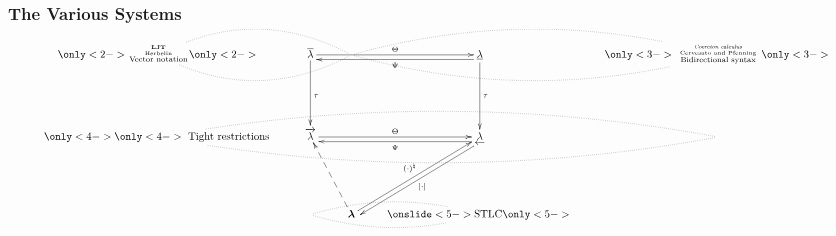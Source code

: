 \begin{frame}
  \frametitle{The Various Systems}


  \[
    \xymatrix{
      &
      \only<2->{ {\textbf{LJT} \atop \text{Herbelin}} \atop \text{Vector notation} }
      \only<2->{ \ar@{.}@/^2pc/[rr] \ar@{.}@/_2pc/[rr] }
      & \olb \ar[rr]^{\Theta} \ar[dd]^{\tau}
      & & \ulb \ar@<1ex>[ll]^{\Psi} \ar[dd]^{\tau}
      &
      \only<3->{ {\text{\emph{Coercion calculus}} \atop \text{ Cervesato and Pfenning }} \atop \text{ Bidirectional syntax } }
      \only<3->{ \ar@{.}@/^2pc/[ll] \ar@{.}@/_2pc/[ll] }
      & 
      \\ \\
      &
      \only<4->{ \ar@{.}@/^2pc/[rrrr] \ar@{.}@/_2pc/[rrrr] }
      \only<4->{ \text{ Tight restrictions } }
      & \tolb \ar[rr]^{\Theta}
      & & \tulb \ar@<1ex>[ll]^{\Psi} \ar@<1ex>[ddl]^{\fgt{\cdot}}
      & &
      \\ \\
      & & & \lbd \ar[uur]^{\bid{(\cdot)}} \ar@{-->}[uul]
      & \onslide<5->{ \text{STLC} } \only<5->{ \ar@{.}@/^1pc/[ll] \ar@{.}@/_1pc/[ll] }
      & &
    }
  \]

  
\end{frame}


